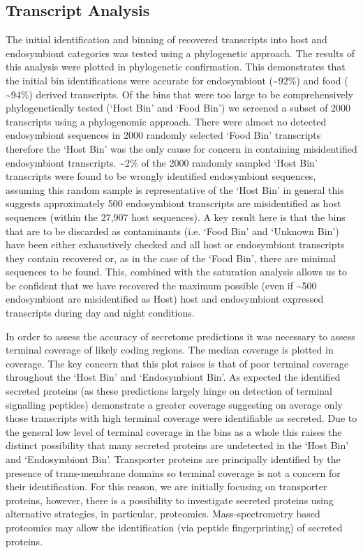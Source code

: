 \subsection{Transcript Analysis}
The initial identification and binning of recovered transcripts into host and endosymbiont categories was tested using a phylogenetic approach. 
The results of this analysis were plotted in phylogenetic confirmation.  
This demonstrates that the initial bin identifications were accurate for endosymbiont (\textasciitilde92\%) and food ( \textasciitilde94\%) derived transcripts.  
Of the bins that were too large to be comprehensively phylogenetically tested (`Host Bin' and `Food Bin') we screened a subset of 2000 transcripts using a phylogenomic approach. 
There were almost no detected endosymbiont sequences in 2000 randomly selected `Food Bin' transcripts therefore the `Host Bin' was the only cause for concern in containing misidentified endosymbiont transcripts.  
\textasciitilde 2\% of the 2000 randomly sampled `Host Bin' transcripts were found to be wrongly identified endosymbiont sequences, assuming this random sample is representative of the `Host Bin' in general this suggests approximately 500 endosymbiont transcripts are misidentified as host sequences (within the 27,907 host sequences).  
A key result here is that the bins that are to be discarded as contaminants (i.e. `Food Bin' and `Unknown Bin') have been either exhaustively checked and all host or endosymbiont transcripts they contain recovered or, as in the case of the `Food Bin', there are minimal sequences to be found.  
This, combined with the saturation analysis allows us to be confident that we have recovered the maximum possible (even if \textasciitilde 500 endosymbiont are misidentified as Host) host and endosymbiont expressed transcripts during day and night conditions.

In order to assess the accuracy of secretome predictions it was necessary to assess terminal coverage of likely coding regions.  
The median coverage is plotted in coverage.  The key concern that this plot raises is that of poor terminal coverage throughout the `Host Bin' and `Endosymbiont Bin'. 
As expected the identified secreted proteins (as these predictions largely hinge on detection of terminal signalling peptides) demonstrate a greater coverage suggesting on average only those transcripts with high terminal coverage were identifiable as secreted.  
Due to the general low level of terminal coverage in the bins as a whole this raises the distinct possibility that many secreted proteins are undetected in the `Host Bin' and `Endosymbiont Bin'. 
Transporter proteins are principally identified by the presence of trans-membrane domains so terminal coverage is not a concern for their identification. 
For this reason, we are initially focusing on transporter proteins, however, there is a possibility to investigate secreted proteins using alternative strategies, in particular, proteomics.  
Mass-spectrometry based proteomics may allow the identification (via peptide fingerprinting) of secreted proteins.

